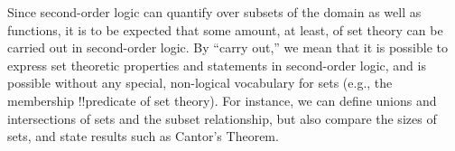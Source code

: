 \documentclass[../../../include/open-logic-section]{subfiles}
\begin{document}

Since second-order logic can quantify over subsets of the domain as
well as functions, it is to be expected that some amount, at least, of
set theory can be carried out in second-order logic. By ``carry out,''
we mean that it is possible to express set theoretic properties and
statements in second-order logic, and is possible without any special,
non-logical vocabulary for sets (e.g., the membership !!{predicate} of
set theory).  For instance, we can define unions and intersections of
sets and the subset relationship, but also compare the sizes of sets,
and state results such as Cantor's Theorem.
\end{document}
